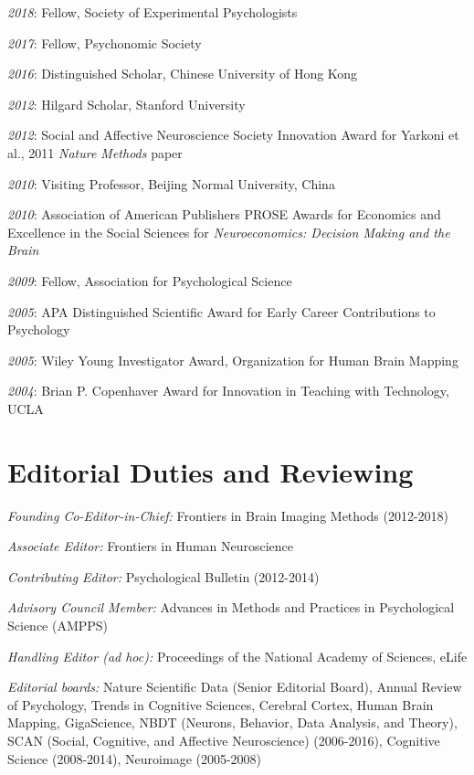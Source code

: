 \documentclass[10pt, letterpaper]{article}
\begin{document}
\textit{2018}: Fellow, Society of Experimental Psychologists

\textit{2017}: Fellow, Psychonomic Society

\textit{2016}: Distinguished Scholar, Chinese University of Hong Kong

\textit{2012}: Hilgard Scholar, Stanford University

\textit{2012}: Social and Affective Neuroscience Society Innovation Award for Yarkoni et al., 2011 \textit{Nature Methods} paper

\textit{2010}: Visiting Professor, Beijing Normal University, China

\textit{2010}: Association of American Publishers PROSE Awards for Economics and Excellence in the Social Sciences for \textit{Neuroeconomics: Decision Making and the Brain} 

\textit{2009}: Fellow, Association for Psychological Science

\textit{2005}: APA Distinguished Scientific Award for Early Career Contributions to Psychology

\textit{2005}: Wiley Young Investigator Award, Organization for Human Brain Mapping

\textit{2004}: Brian P. Copenhaver Award for Innovation in Teaching with Technology, UCLA

\section*{Editorial Duties and Reviewing}
\noindent
\textit{Founding Co-Editor-in-Chief:} Frontiers in Brain Imaging Methods (2012-2018)\vspace{2mm}

\textit{Associate Editor:} Frontiers in Human Neuroscience\vspace{2mm}

\textit{Contributing Editor:} Psychological Bulletin (2012-2014)\vspace{2mm}

\textit{Advisory Council Member:} Advances in Methods and Practices in Psychological Science (AMPPS) \vspace{2mm}

\textit{Handling Editor (ad hoc):} Proceedings of the National Academy of Sciences, eLife\vspace{2mm}

\textit{Editorial boards:} Nature Scientific Data (Senior Editorial Board), Annual Review of Psychology, Trends in Cognitive Sciences, Cerebral Cortex, Human Brain Mapping, GigaScience, NBDT (Neurons, Behavior, Data Analysis, and Theory), SCAN (Social, Cognitive, and Affective Neuroscience) (2006-2016), Cognitive Science (2008-2014), Neuroimage (2005-2008)\vspace{2mm}
\end{document}

